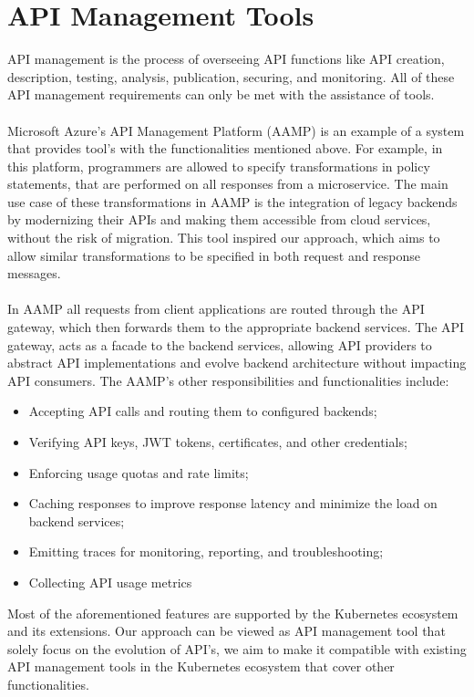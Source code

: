 \section{API Management Tools} %
\label{sec:api_management_tools}

API management is the process of overseeing API functions like API creation, description, testing, analysis, publication, securing, and monitoring.
All of these API management requirements can only be met with the assistance of tools.

\paragraph{}

Microsoft Azure's API Management Platform (AAMP) is an example of a system that provides tool's with the functionalities mentioned above.
For example, in this platform, programmers are allowed to specify transformations in policy statements, that are performed on all responses from a microservice.
The main use case of these transformations in AAMP is the integration of legacy backends by modernizing their APIs and making them accessible from cloud services, without the risk of migration.
This tool inspired our approach, which aims to allow similar transformations to be specified in both request and response messages.

\paragraph{}

In AAMP all requests from client applications are routed through the API gateway, which then forwards them to the appropriate backend services.
The API gateway, acts as a facade to the backend services,
allowing API providers to abstract API implementations and evolve backend architecture without impacting API consumers.
The AAMP's other responsibilities and functionalities include:

\begin{itemize}
    \item Accepting API calls and routing them to configured backends;
    \item Verifying API keys, JWT tokens, certificates, and other credentials;
    \item Enforcing usage quotas and rate limits;
    \item Caching responses to improve response latency and minimize the load on backend services;
    \item Emitting traces for monitoring, reporting, and troubleshooting;
    \item Collecting API usage metrics
\end{itemize}

Most of the aforementioned features are supported by the Kubernetes ecosystem and its extensions.
Our approach can be viewed as API management tool that solely focus on the evolution of API's,
we aim to make it compatible with existing API management tools in the Kubernetes ecosystem that cover other functionalities.
